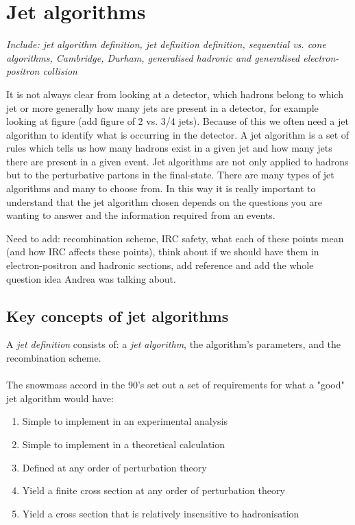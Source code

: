 \section{Jet algorithms}
\emph{Include: jet algorithm definition, jet definition definition, sequential vs. cone algorithms, Cambridge, Durham, generalised hadronic and generalised electron-positron collision}

It is not always clear from looking at a detector, which hadrons belong to which jet or more generally how many jets are present in a detector, for example looking at figure {\color{green} (add figure of 2 vs. 3/4 jets)}. Because of this we often need a jet algorithm to identify what is occurring in the detector. A jet algorithm is a set of rules which tells us how many hadrons exist in a given jet and how many jets there are present in a given event. Jet algorithms are not only applied to hadrons but to the perturbative partons in the final-state. There are many types of jet algorithms and many to choose from. In this way it is really important to understand that the jet algorithm chosen depends on the questions you are wanting to answer and the information required from an events.

{\color{green} Need to add: recombination scheme, IRC safety, what each of these points mean (and how IRC affects these points), think about if we should have them in electron-positron and hadronic sections, add reference and add the whole question idea Andrea was talking about.}

\subsection{Key concepts of jet algorithms}
A \emph{jet definition} consists of: a \emph{jet algorithm}, the algorithm's parameters, and the recombination scheme. \\ \\
The snowmass accord in the 90's set out a set of requirements for what a "good" jet algorithm would have:
\begin{enumerate}
	\item Simple to implement in an experimental analysis
	\item Simple to implement in a theoretical calculation
	\item Defined at any order of perturbation theory
	\item Yield a finite cross section at any order of perturbation theory
	\item Yield a cross section that is relatively insensitive to hadronisation
\end{enumerate} 

